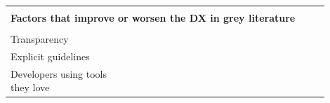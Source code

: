 \documentclass[english, 12pt, a4paper, sci, utf8, a-1b, online]{aaltothesis}
\begin{document}
\begin{center}
\begin{longtable}{p{0.3\linewidth}p{0.6\linewidth}}
                                            &                                                                                                                                                                                                                                                                                                                              \\
    \multicolumn{2}{l}{\textbf{Factors that improve or worsen the DX in grey literature}}                                                                                                                                                                                                                                                                                                                                               \\
    \hline                                                                                                                                                                                                                                                                                                                                                                 \\
    Transparency                            & \textcite{workflows-for-the-new-developer-experience} \newline \textcite{4-apis-doing-developer-experience-really-well} \newline \textcite{dx-devs-are-people-too}                                                                                                                                                           \\
    Explicit guidelines                     & \textcite{the-best-practices-for-a-great-dx} \newline \textcite{what-exactly-is-developer-experience}                                                                                                                                                                                                                        \\
    Developers using tools they love        & \textcite{heroku-dx} \newline \textcite{great-dx-and-the-people-who-make-them} \newline \textcite{how-i-missed-it-before} \newline \textcite{building-the-developer-experience-from-the-ground-up} \newline \textcite{what-is-api-developer-experience-and-why-it-matters}                                                   \\

\end{longtable}
\end{center}
\end{document}
